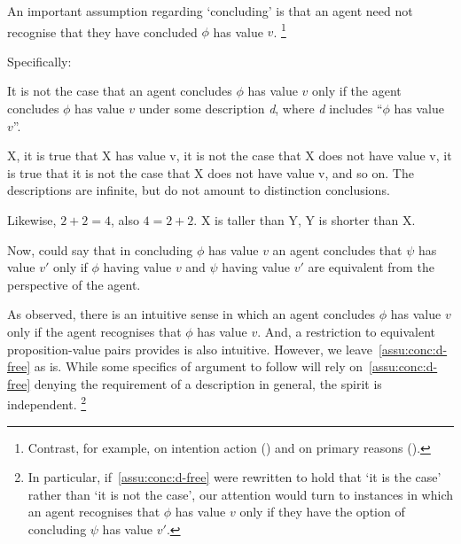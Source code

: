 \begin{note}[Descriptions]
  An important assumption regarding `concluding' is that an agent need not recognise that they have concluded \(\phi\) has value \(v\).\nolinebreak
  \footnote{
    Contrast, for example, \citeauthor{Anscombe:1957aa} on intention action (\citeyear[\S19]{Anscombe:1957aa}) and \citeauthor{Davidson:1963aa} on primary reasons (\citeyear[5]{Davidson:1963aa}).
  }

  Specifically:
  \begin{assumption}
    \label{assu:conc:d-free}
    It is not the case that an agent concludes \(\phi\) has value \(v\) only if the agent concludes \(\phi\) has value \(v\) under some description \emph{d}, where \emph{d} includes ``\(\phi\) has value \(v\)''.
  \end{assumption}

  X, it is true that X has value v, it is not the case that X does not have value v, it is true that it is not the case that X does not have value v, and so on.
  The descriptions are infinite, but do not amount to distinction conclusions.

  Likewise, \(2 + 2 = 4\), also \(4 = 2 + 2\).
  X is taller than Y, Y is shorter than X.

  Now, could say that in concluding \(\phi\) has value \(v\) an agent concludes that \(\psi\) has value \(v'\) only if \(\phi\) having value \(v\) and \(\psi\) having value \(v'\) are equivalent from the perspective of the agent.

  As observed, there is an intuitive sense in which an agent concludes \(\phi\) has value \(v\) only if the agent recognises that \(\phi\) has value \(v\).
  And, a restriction to equivalent proposition-value pairs provides is also intuitive.
  However, we leave~\autoref{assu:conc:d-free} as is.
  While some specifics of argument to follow will rely on~\autoref{assu:conc:d-free} denying the requirement of a description in general, the spirit is independent.\nolinebreak
  \footnote{
    In particular, if~\autoref{assu:conc:d-free} were rewritten to hold that `it is the case' rather than `it is not the case', our attention would turn to instances in which an agent recognises that \(\phi\) has value \(v\) only if they have the option of concluding \(\psi\) has value \(v'\).
  }


\end{note}
